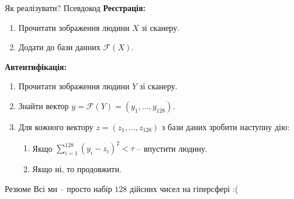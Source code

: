 \documentclass[xcolor={usenames,dvipsnames}]{beamer}
\begin{document}
    \begin{frame}{Як реалізувати? Псевдокод}
        \textbf{Реєстрація:}

        \begin{enumerate}
            \item Прочитати зображення людини $X$ зі сканеру.
            \item Додати до бази данних $\mathcal{F}(X)$.
        \end{enumerate}

        \textbf{Автентифікація:}
        \begin{enumerate}
            \item Прочитати зображення людини $Y$ зі сканеру.
            \item Знайти вектор $y = \mathcal{F}(Y) = (y_1,\dots,y_{128})$.
            \item Для кожного вектору $z=(z_1,\dots,z_{128})$ з бази даних зробити наступну дію:
            \begin{enumerate}
                \item Якщо $\sum_{i=1}^{128}(y_i-z_i)^2 < \tau$ -- впустити людину.
                \item Якщо ні, то продовжити.
            \end{enumerate}
        \end{enumerate}

        \begin{block}{Резюме}
            Всі ми -- просто набір $128$ дійсних чисел на гіперсфері :(
        \end{block}
    \end{frame}
\end{document}
